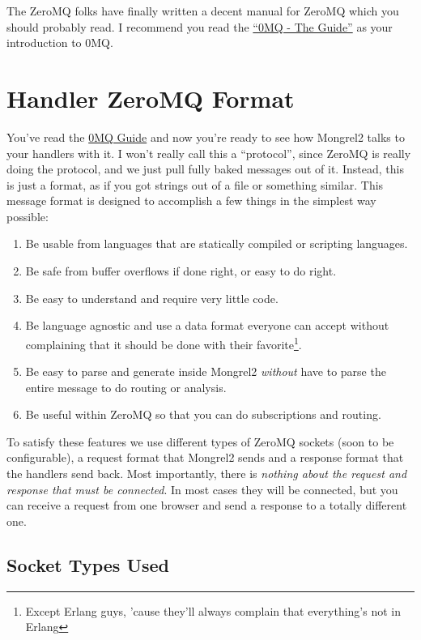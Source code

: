 The ZeroMQ folks have finally written a decent manual for ZeroMQ which you should
probably read.  I recommend you read the \href{http://zguide.zeromq.org/page:all}{``0MQ - The Guide''}
as your introduction to 0MQ.

\section{Handler ZeroMQ Format}

You've read the \href{http://zguide.zeromq.org/page:all}{0MQ Guide} and now you're
ready to see how Mongrel2 talks to your handlers with it.  I won't really call this a ``protocol'',
since ZeroMQ is really doing the protocol, and we just pull fully baked messages out of it.  Instead,
this is just a format, as if you got strings out of a file or something similar.  This message
format is designed to accomplish a few things in the simplest way possible:

\begin{enumerate}
\item Be usable from languages that are statically compiled or scripting languages.
\item Be safe from buffer overflows if done right, or easy to do right.
\item Be easy to understand and require very little code.
\item Be language agnostic and use a data format everyone can accept without complaining
    that it should be done with their favorite\footnote{Except Erlang guys, 'cause they'll always
    complain that everything's not in Erlang}.
\item Be easy to parse and generate inside Mongrel2 \emph{without} have to parse the entire message
    to do routing or analysis.
\item Be useful within ZeroMQ so that you can do subscriptions and routing.
\end{enumerate}

To satisfy these features we use different types of ZeroMQ sockets (soon to be configurable),
a request format that Mongrel2 sends and a response format that the handlers send back.  Most
importantly, there is \emph{nothing about the request and response that must be connected}.  In most
cases they will be connected, but you can receive a request from one browser and send a response
to a totally different one.

\subsection{Socket Types Used}

